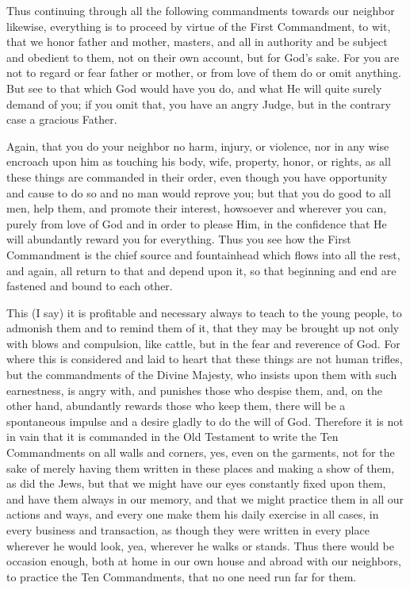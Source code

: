Thus continuing through all the following commandments towards our
neighbor likewise, everything is to proceed by virtue of the First
Commandment, to wit, that we honor father and mother, masters, and all
in authority and be subject and obedient to them, not on their own
account, but for God's sake. For you are not to regard or fear father
or mother, or from love of them do or omit anything. But see to that
which God would have you do, and what He will quite surely demand of
you; if you omit that, you have an angry Judge, but in the contrary
case a gracious Father.

Again, that you do your neighbor no harm, injury, or violence, nor in
any wise encroach upon him as touching his body, wife, property, honor,
or rights, as all these things are commanded in their order, even
though you have opportunity and cause to do so and no man would reprove
you; but that you do good to all men, help them, and promote their
interest, howsoever and wherever you can, purely from love of God and
in order to please Him, in the confidence that He will abundantly
reward you for everything. Thus you see how the First Commandment is
the chief source and fountainhead which flows into all the rest, and
again, all return to that and depend upon it, so that beginning and end
are fastened and bound to each other.

This (I say) it is profitable and necessary always to teach to the
young people, to admonish them and to remind them of it, that they may
be brought up not only with blows and compulsion, like cattle, but in
the fear and reverence of God. For where this is considered and laid to
heart that these things are not human trifles, but the commandments of
the Divine Majesty, who insists upon them with such earnestness, is
angry with, and punishes those who despise them, and, on the other
hand, abundantly rewards those who keep them, there will be a
spontaneous impulse and a desire gladly to do the will of God.
Therefore it is not in vain that it is commanded in the Old Testament
to write the Ten Commandments on all walls and corners, yes, even on
the garments, not for the sake of merely having them written in these
places and making a show of them, as did the Jews, but that we might
have our eyes constantly fixed upon them, and have them always in our
memory, and that we might practice them in all our actions and ways,
and every one make them his daily exercise in all cases, in every
business and transaction, as though they were written in every place
wherever he would look, yea, wherever he walks or stands. Thus there
would be occasion enough, both at home in our own house and abroad with
our neighbors, to practice the Ten Commandments, that no one need run
far for them.


